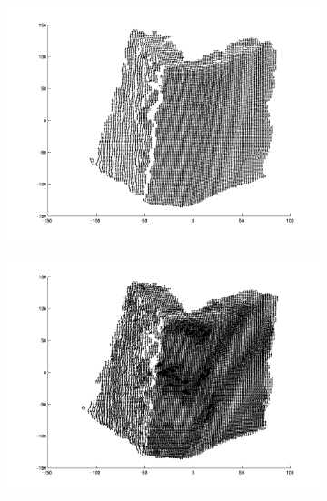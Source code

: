 \begin{figure}
	\centering
	
	\begin{subfigure}[b]{0.3\textwidth}
		\centering
		\includegraphics[width=\textwidth]{Images/Book1.png}
		\caption{}
	\end{subfigure}%
	\begin{subfigure}[b]{0.3\textwidth}
		\centering
		\includegraphics[width=\textwidth]{Images/Book2.png}
		\caption{}
	\end{subfigure}
	\begin{subfigure}[b]{0.3\textwidth}
		\centering

\end{subfigure}
\end{figure}
